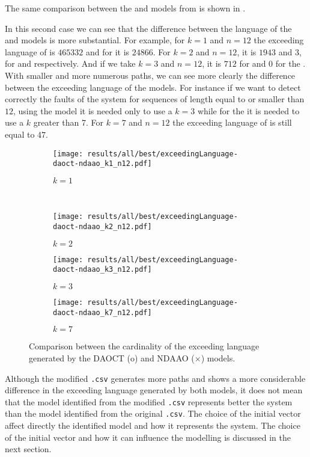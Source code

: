 The same comparison between the \DAOCT{} and \NDAAO{} models from
 is shown in .

In this second case we can see that the difference between the language of the \DAOCT{} and
\NDAAO{} models is more substantial. For example, for $k=1$ and $n=12$ the
exceeding language of \NDAAO{} is $465332$ and for \DAOCT{} it is $24866$. For
$k=2$ and $n=12$, it is $1943$ and $3$, for \NDAAO{} and \DAOCT{} respectively. And
if we take $k=3$ and $n=12$, it is $712$ for \NDAAO{} and $0$ for the \DAOCT{}. With
smaller and more numerous paths, we can see more clearly the difference between the
exceeding language of the models. For instance if we want to detect correctly
the faults of the system for sequences of length equal to or smaller
than $12$, using the \DAOCT{} model it is needed only to use a $k=3$ while for the
\NDAAO{} it is needed to use a $k$ greater than 7. For $k=7$ and $n=12$ the
exceeding language of \NDAAO{} is still equal to $47$. 

\begin{figure}[H]
  \begin{subfigure}[H]{0.5\textwidth}
    \centering
    \texttt{[image: results/all/best/exceedingLanguage-daoct-ndaao\_k1\_n12.pdf]}
    \caption{$k=1$}
    \label{fig:daoctNdaaoBestkone}
  \end{subfigure}
  ~
  \begin{subfigure}[h]{0.5\textwidth}
    \centering
    \texttt{[image: results/all/best/exceedingLanguage-daoct-ndaao\_k2\_n12.pdf]}
    \caption{$k=2$}
    \label{fig:daoctNdaaoBestktwo}
  \end{subfigure}
  \begin{subfigure}[h]{0.5\textwidth}
    \centering
    \texttt{[image: results/all/best/exceedingLanguage-daoct-ndaao\_k3\_n12.pdf]}
    \caption{$k=3$}
    \label{fig:daoctNdaaoBestkthree}
  \end{subfigure}
  \begin{subfigure}[h]{0.5\textwidth}
    \centering
    \texttt{[image: results/all/best/exceedingLanguage-daoct-ndaao\_k7\_n12.pdf]}
    \caption{$k=7$}
    \label{fig:daoctNdaaoBestkseven}
  \end{subfigure}
  \caption[Comparison between the cardinality of the exceeding language generated by the DAOCT and
NDAAO.]{Comparison between the cardinality of the exceeding language generated by the DAOCT (o) and
NDAAO ($\times$) models.}
\end{figure}
Although the modified \verb|.csv| generates more paths and shows a more
considerable difference in the exceeding language generated by both models, it
does not mean that the model identified from the modified \verb|.csv| represents better the
system than the model identified from the original \verb|.csv|.
The choice of the initial vector affect directly the identified
model and how it represents the system. The choice of the initial vector and how
it can influence the modelling is discussed in the
next section.
\newpage
